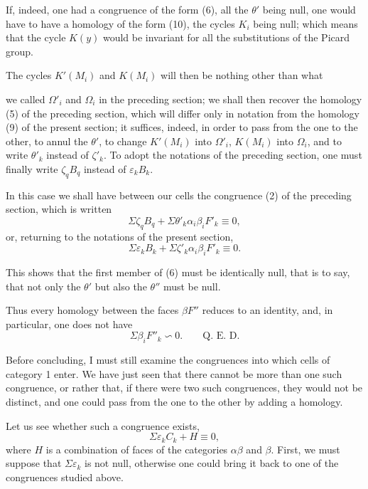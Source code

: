 \documentclass{article}
\begin{document}
If, indeed, one had a congruence of the form (6), all the $\theta'$ being null, one would have to have a homology of the form (10), the cycles $K_{i}$ being null; which means that the cycle $K(y)$ would be invariant for all the substitutions of the Picard group.

The cycles $K'(M_{i})$ and $K(M_{i})$ will then be nothing other than what

we called $\Omega'_{i}$ and $\Omega_{i}$ in the preceding section; we shall then recover the homology (5) of the preceding section, which will differ only in notation from the homology (9) of the present section; it suffices, indeed, in order to pass from the one to the other, to annul the $\theta'$, to change $K'(M_{i})$ into $\Omega'_{i}$, $K(M_{i})$ into $\Omega_{i}$, and to write $\theta'_{k}$ instead of $\zeta'_{k}$. To adopt the notations of the preceding section, one must finally write $\zeta_{q}B_{q}$ instead of $\varepsilon_{k}B_{k}$.

In this case we shall have between our cells the congruence (2) of the preceding section, which is written
\[ \Sigma \zeta_{q} B_{q} + \Sigma \theta'_{k} \alpha_{i}\beta_{i}F'_{k} \equiv 0, \]
or, returning to the notations of the present section,
\[ \Sigma \varepsilon_{k} B_{k} + \Sigma \zeta'_{k} \alpha_{i}\beta_{i}F'_{k} \equiv 0. \]

This shows that the first member of (6) must be identically null, that is to say, that not only the $\theta'$ but also the $\theta''$ must be null.

Thus every homology between the faces $\beta F''$ reduces to an identity, and, in particular, one does not have
\[ \Sigma \beta_{i}F''_{k} \backsim 0. \qquad \text{Q.~E.~D.} \]

Before concluding, I must still examine the congruences into which cells of category 1 enter. We have just seen that there cannot be more than one such congruence, or rather that, if there were two such congruences, they would not be distinct, and one could pass from the one to the other by adding a homology.

Let us see whether such a congruence exists,
\[ \Sigma \varepsilon_{k} C_{k} + H \equiv 0, \tag{12} \]
where $H$ is a combination of faces of the categories $\alpha\beta$ and $\beta$. First, we must suppose that $\Sigma \varepsilon_{k}$ is not null, otherwise one could bring it back to one of the congruences studied above.
\end{document}
